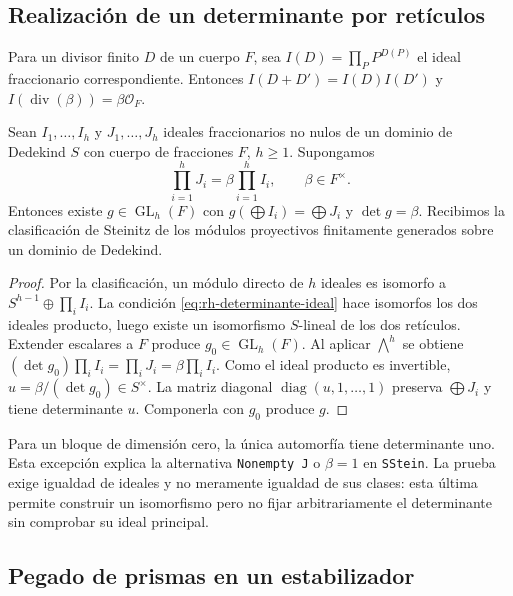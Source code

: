 \subsection{Realización de un determinante por retículos}

Para un divisor finito $D$ de un cuerpo $F$, sea $I(D)=\prod_P P^{D(P)}$ el ideal fraccionario correspondiente. Entonces $I(D+D')=I(D)I(D')$ y $I(\operatorname{div}(\beta))=\beta\mathcal O_F$.

\begin{proposicion}
\label{prop:rh-portador}
Sean $I_1,\dots,I_h$ y $J_1,\dots,J_h$ ideales fraccionarios no nulos de un dominio de Dedekind $S$ con cuerpo de fracciones $F$, $h\ge1$. Supongamos
\begin{equation}
 \prod_{i=1}^h J_i=\beta\prod_{i=1}^h I_i,\qquad \beta\in F^\times.
 \label{eq:rh-determinante-ideal}
\end{equation}
Entonces existe $g\in\operatorname{GL}_h(F)$ con
$g(\bigoplus I_i)=\bigoplus J_i$ y $\det g=\beta$. Recibimos la clasificación de Steinitz de los módulos proyectivos finitamente generados sobre un dominio de Dedekind.
\end{proposicion}
\begin{proof}
Por la clasificación, un módulo directo de $h$ ideales es isomorfo a $S^{h-1}\oplus\prod_i I_i$. La condición \eqref{eq:rh-determinante-ideal} hace isomorfos los dos ideales producto, luego existe un isomorfismo $S$-lineal de los dos retículos. Extender escalares a $F$ produce $g_0\in\operatorname{GL}_h(F)$. Al aplicar $\bigwedge^h$ se obtiene $(\det g_0)\prod_i I_i=\prod_i J_i=\beta\prod_i I_i$. Como el ideal producto es invertible, $u=\beta/(\det g_0)\in S^\times$. La matriz diagonal $\operatorname{diag}(u,1,\dots,1)$ preserva $\bigoplus J_i$ y tiene determinante $u$. Componerla con $g_0$ produce $g$.
\end{proof}

Para un bloque de dimensión cero, la única automorfía tiene determinante uno. Esta excepción explica la alternativa \texttt{Nonempty J} o $\beta=1$ en \texttt{SStein}. La prueba exige igualdad de ideales y no meramente igualdad de sus clases: esta última permite construir un isomorfismo pero no fijar arbitrariamente el determinante sin comprobar su ideal principal.

\subsection{Pegado de prismas en un estabilizador}

